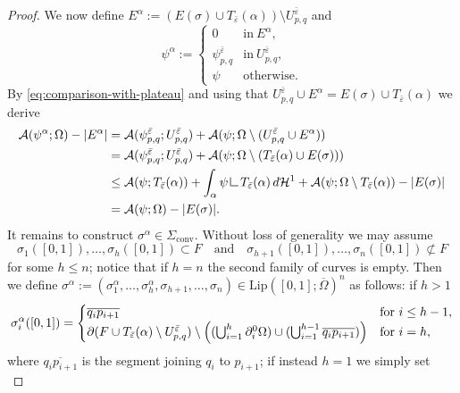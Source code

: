\documentclass[JEP,XML,SOM,Unicode, NoFloatCountersInSection,published]{cedram}
\let\eps\varepsilon
\let\Om\Omega
\newcommand{\Lip}{\mathrm{Lip}}
\newcommand{\resa}{\mathop{\hbox{\vrule height 7pt width 0.5pt depth 0pt
\vrule height 0.5pt width 6pt depth 0pt}}\nolimits}
\newcommand{\resb}{\mathop{\hbox{\vrule height 4pt width 0.5pt depth 0pt
\vrule height 0.5pt width 3pt depth 0pt}}\nolimits}
\newcommand{\res}{\mathchoice{\resa}{\resa}{\resb}{\resb}}
\theoremstyle{definition}
\begin{document}
\begin{proof}
We now define $E^\alpha:=(E(\sigma)\cup T_{\bar\eps}(\alpha))\setminus U^{\bar\eps}_{p,q}$ and
\begin{equation*}
\psi^\alpha:=\begin{cases}
0&\text{in}\ E^\alpha,\\
\psi^{\bar\eps}_{p,q}& \text{in}\ U^{\bar\eps}_{p,q}, \\
\psi& \text{otherwise}.
\end{cases}
\end{equation*}
By \eqref{eq:comparison-with-plateau} and using that $U^{\bar\eps}_{p,q}\cup E^\alpha=E(\sigma)\cup T_{\bar\eps}(\alpha)$ we derive
\begin{align}
\mathcal{A}(\psi^\alpha;\Om)-|E^\alpha|
&= \mathcal A(\psi^{\bar\eps}_{p,q};U^{\bar\eps}_{p,q})+
\mathcal{A}(\psi; \Om\setminus(U^{\bar\eps}_{p,q}\cup E^\alpha))\notag
\\
&= \mathcal A(\psi^{\bar\eps}_{p,q};U^{\bar\eps}_{p,q})+
\mathcal{A}(\psi; \Om\setminus(T_{\bar\eps}(\alpha)\cup E(\sigma)))\notag\\[-8pt]\label{eq:area_psi'}\\[-8pt]
&\le \mathcal A(\psi; T_{\bar\eps}(\alpha))+
\int_{\alpha}\psi\res{T_{\bar\eps}(\alpha)}\,d\mathcal{H}^1+\mathcal{A}(\psi; \Omega\setminus T_{\bar\eps}(\alpha))-|E(\sigma)|\notag
\\
&=\mathcal{A}(\psi; \Omega)-|E(\sigma)|.\notag
\end{align}
It remains to construct $\sigma^\alpha\in \Sigma_\mathrm{conv}$. Without loss of generality we may assume
\[
\sigma_1([0,1]),\dots,\sigma_h([0,1])\subset F\quad\text{and}\quad \sigma_{h+1}([0,1]),\dots,\sigma_n([0,1])\not\subset F
\]
for some $h\le n$; notice that if $h=n$ the second family of curves is empty. Then we define $\sigma^\alpha:=(\sigma^\alpha_1,\dots,\sigma_h^\alpha,\sigma_{h+1},\dots,\sigma_n)\in\Lip([0,1];\overline\Om)^n$ as follows: if $h>1$
\begin{equation*}
\sigma^\alpha_{i}([0,1])=\begin{cases}
\overline{q_{i}p_{i+1}}&\text{for } i\leq h-1,\\
\partial (F\cup T_{\bar\eps}(\alpha)\setminus U^{\bar{\eps}}_{p,q})\setminus\Bigl((\bigcup_{i=1}^{h}\partial^0_i\Om)\cup
(\bigcup_{i=1}^{h-1}\overline{q_{i}p_{i+1}})\Bigr)&\text{for } i=h,
\end{cases}
\end{equation*}
where $ \overline{q_{i}p_{i+1}}$ is the segment joining $q_i$ to $p_{i+1}$; if instead $h=1$ we simply set
\begin{equation*}

\end{equation*}
\end{proof}
\end{document}
